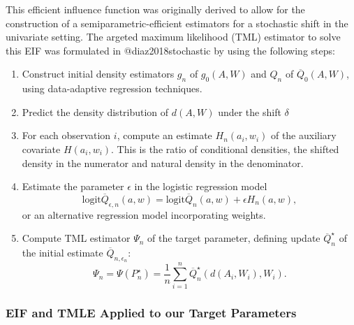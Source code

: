 \documentclass[
]{article}
\providecommand{\tightlist}{%
  \setlength{\itemsep}{0pt}\setlength{\parskip}{0pt}}
\begin{document}
This efficient influence function was originally derived to allow for
the construction of a semiparametric-efficient estimators for a
stochastic shift in the univariate setting. The argeted maximum
likelihood (TML) estimator to solve this EIF was formulated in
@diaz2018stochastic by using the following steps:

\begin{enumerate}
\def\labelenumi{\arabic{enumi}.}
\tightlist
\item
  Construct initial density estimators \(g_n\) of \(g_0(A, W)\) and
  \(Q_n\) of \(\overline{Q}_0(A, W)\), using data-adaptive regression
  techniques.
\item
  Predict the density distribution of \(d(A,W)\) under the shift
  \(\delta\)
\item
  For each observation \(i\), compute an estimate \(H_n(a_i, w_i)\) of
  the auxiliary covariate \(H(a_i,w_i)\). This is the ratio of
  conditional densities, the shifted density in the numerator and
  natural density in the denominator.
\item
  Estimate the parameter \(\epsilon\) in the logistic regression model
  \[ \text{logit}\overline{Q}_{\epsilon, n}(a, w) =
  \text{logit}\overline{Q}_n(a, w) + \epsilon H_n(a, w),\] or an
  alternative regression model incorporating weights.
\item
  Compute TML estimator \(\Psi_n\) of the target parameter, defining
  update \(\overline{Q}_n^{\star}\) of the initial estimate
  \(\overline{Q}_{n, \epsilon_n}\): \begin{equation}
    \Psi_n = \Psi(P_n^{\star}) = \frac{1}{n} \sum_{i = 1}^n
    \overline{Q}_n^{\star}(d(A_i, W_i), W_i).
  \end{equation}
\end{enumerate}

\hypertarget{eif-and-tmle-applied-to-our-target-parameters}{%
\subsubsection{EIF and TMLE Applied to our Target
Parameters}\label{eif-and-tmle-applied-to-our-target-parameters}}
\end{document}
